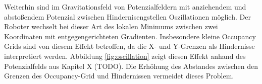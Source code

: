 Weiterhin sind im Gravitationsfeld von Potenzialfeldern mit anziehendem und abstoßendem Potenzial zwischen Hindernisengstellen Oszillationen möglich. Der Roboter wechselt bei dieser Art des lokalen Minimums zwischen zwei Koordinaten mit entgegengerichteten Gradienten.
Insbesondere kleine Occupancy Grids sind von diesem Effekt betroffen, da die X- und Y-Grenzen als Hindernisse interpretiert werden. Abbildung \ref{fig:oscillation} zeigt diesen Effekt anhand des Potenzialfelds aus Kapitel X (TODO).
Die Erhöhung des Abstandes zwischen den Grenzen des Occupancy-Grid und Hindernissen vermeidet dieses Problem.
\begin{figure}[H]
	\footnotesize
	\centering
	\hspace*{\fill}
	\begin{minipage}{0.46\textwidth}%
		\centerline{}
	\end{minipage}
	\hspace*{\fill}
	\begin{minipage}{0.46\textwidth}%
		\footnotesize

\end{minipage}
\end{figure}
